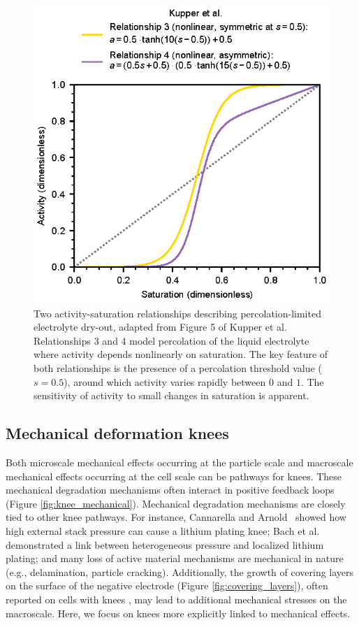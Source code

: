 \documentclass[journal=jpclcd,manuscript=article]{achemso}
\begin{document}
\begin{figure}[ht]
    \centering
    \includegraphics[scale=1.0]{figures/percolation.eps}
    \caption{Two activity-saturation relationships describing percolation-limited electrolyte dry-out, adapted from Figure 5 of Kupper et al.\cite{kupper_end--life_2018} Relationships 3 and 4 model percolation of the liquid electrolyte where activity depends nonlinearly on saturation. The key feature of both relationships is the presence of a percolation threshold value ($s=0.5$), around which activity varies rapidly between $0$ and $1$.
    The sensitivity of activity to small changes in saturation is apparent.}
    \label{fig:percolation}
\end{figure}

\subsection{Mechanical deformation knees}

Both microscale mechanical effects occurring at the particle scale and macroscale mechanical effects occurring at the cell scale can be pathways for knees.
These mechanical degradation mechanisms often interact in positive feedback loops (Figure \ref{fig:knee_mechanical}).
Mechanical degradation mechanisms are closely tied to other knee pathways. For instance, Cannarella and Arnold~\cite{cannarella_stress_2014} showed how high external stack pressure can cause a lithium plating knee; Bach et al.\cite{bach_nonlinear_2016} demonstrated a link between heterogeneous pressure and localized lithium plating; and many loss of active material mechanisms are mechanical in nature (e.g., delamination, particle cracking).
Additionally, the growth of covering layers on the surface of the negative electrode (Figure \ref{fig:covering_layers}), often reported on cells with knees \cite{lewerenz_post-mortem_2017,willenberg_development_2020,stiaszny_electrochemical_2014, fang_capacity_2021}{}, may lead to additional mechanical stresses on the macroscale.
Here, we focus on knees more explicitly linked to mechanical effects.
\end{document}
